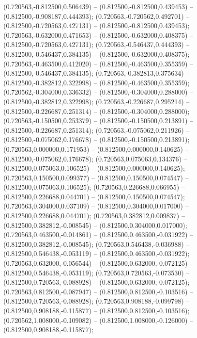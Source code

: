  (0.720563,-0.812500,0.506439) -- (0.812500,-0.812500,0.439453) -- (0.812500,-0.908187,0.444393);
 (0.720563,-0.720562,0.492701) -- (0.812500,-0.720563,0.427131) -- (0.812500,-0.812500,0.439453);
 (0.720563,-0.632000,0.471653) -- (0.812500,-0.632000,0.408375) -- (0.812500,-0.720563,0.427131);
 (0.720563,-0.546437,0.444393) -- (0.812500,-0.546437,0.384135) -- (0.812500,-0.632000,0.408375);
 (0.720563,-0.463500,0.412020) -- (0.812500,-0.463500,0.355359) -- (0.812500,-0.546437,0.384135);
 (0.720563,-0.382813,0.375634) -- (0.812500,-0.382812,0.322998) -- (0.812500,-0.463500,0.355359);
 (0.720562,-0.304000,0.336332) -- (0.812500,-0.304000,0.288000) -- (0.812500,-0.382812,0.322998);
 (0.720563,-0.226687,0.295214) -- (0.812500,-0.226687,0.251314) -- (0.812500,-0.304000,0.288000);
 (0.720563,-0.150500,0.253379) -- (0.812500,-0.150500,0.213891) -- (0.812500,-0.226687,0.251314);
 (0.720563,-0.075062,0.211926) -- (0.812500,-0.075062,0.176678) -- (0.812500,-0.150500,0.213891);
 (0.720563,0.000000,0.171953) -- (0.812500,0.000000,0.140625) -- (0.812500,-0.075062,0.176678);
 (0.720563,0.075063,0.134376) -- (0.812500,0.075063,0.106525) -- (0.812500,0.000000,0.140625);
 (0.720563,0.150500,0.099377) -- (0.812500,0.150500,0.074547) -- (0.812500,0.075063,0.106525);
 (0.720563,0.226688,0.066955) -- (0.812500,0.226688,0.044701) -- (0.812500,0.150500,0.074547);
 (0.720563,0.304000,0.037109) -- (0.812500,0.304000,0.017000) -- (0.812500,0.226688,0.044701);
 (0.720563,0.382812,0.009837) -- (0.812500,0.382812,-0.008545) -- (0.812500,0.304000,0.017000);
 (0.720563,0.463500,-0.014861) -- (0.812500,0.463500,-0.031922) -- (0.812500,0.382812,-0.008545);
 (0.720563,0.546438,-0.036988) -- (0.812500,0.546438,-0.053119) -- (0.812500,0.463500,-0.031922);
 (0.720563,0.632000,-0.056544) -- (0.812500,0.632000,-0.072125) -- (0.812500,0.546438,-0.053119);
 (0.720563,0.720563,-0.073530) -- (0.812500,0.720563,-0.088928) -- (0.812500,0.632000,-0.072125);
 (0.720563,0.812500,-0.087947) -- (0.812500,0.812500,-0.103516) -- (0.812500,0.720563,-0.088928);
 (0.720563,0.908188,-0.099798) -- (0.812500,0.908188,-0.115877) -- (0.812500,0.812500,-0.103516);
 (0.720562,1.008000,-0.109082) -- (0.812500,1.008000,-0.126000) -- (0.812500,0.908188,-0.115877);
